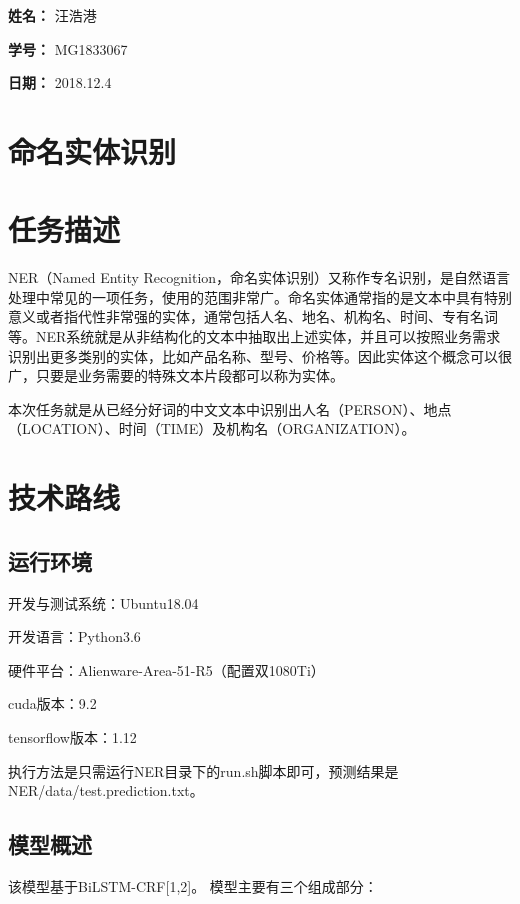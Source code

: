 \documentclass[UTF8]{article}
\begin{document}
    
{\flushleft \bf \Large 姓名：} 汪浩港

{\flushleft \bf \Large 学号：} MG1833067

{\flushleft \bf \Large 日期：} 2018.12.4

\section*{命名实体识别}
    
    
\section{任务描述}

NER（Named Entity Recognition，命名实体识别）又称作专名识别，是自然语言处理中常见的一项任务，使用的范围非常广。命名实体通常指的是文本中具有特别意义或者指代性非常强的实体，通常包括人名、地名、机构名、时间、专有名词等。NER系统就是从非结构化的文本中抽取出上述实体，并且可以按照业务需求识别出更多类别的实体，比如产品名称、型号、价格等。因此实体这个概念可以很广，只要是业务需要的特殊文本片段都可以称为实体。

本次任务就是从已经分好词的中文文本中识别出人名（PERSON）、地点（LOCATION）、时间（TIME）及机构名（ORGANIZATION）。



\section{技术路线}

\subsection{运行环境}
开发与测试系统：Ubuntu18.04

开发语言：Python3.6

硬件平台：Alienware-Area-51-R5（配置双1080Ti）

cuda版本：9.2

tensorflow版本：1.12


执行方法是只需运行NER目录下的run.sh脚本即可，预测结果是NER/data/test.prediction.txt。
\subsection{模型概述}
该模型基于BiLSTM-CRF[1,2]。 模型主要有三个组成部分：
\end{document}

